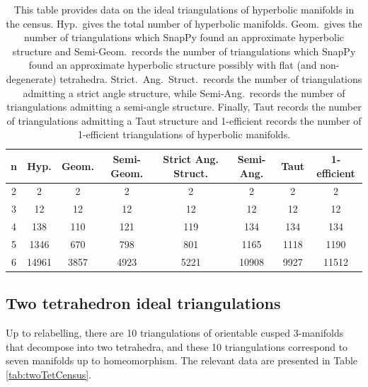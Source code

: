 \documentclass[12pt,reqno]{amsart}  %
\theoremstyle{definition}
\theoremstyle{remark}
\begin{document}
\begin{table}[h]
\begin{tabular}{|c|c|c|c|c|c|c|c|}
\hline
n & Hyp. &Geom. &Semi-Geom. & Strict Ang. Struct. & Semi-Ang.&  Taut & 1-efficient\\
\hline
2&	2&	  2&	    2&	  2 &2 &2 &2\\
\hline
3&	12& 12 & 12 & 12& 12& 12&12\\
\hline
4&	138& 110& 121 & 119 & 134 & 134 & 134\\
\hline
5&	1346&670&798&801&1165 & 1118&1190\\
\hline
6&	14961&3857&4923&5221&10908&9927&11512\\
\hline
\end{tabular}

\caption{\label{hypCensus} This table provides data on the ideal 
triangulations of hyperbolic manifolds in the census. Hyp.~gives the 
total number of hyperbolic manifolds. Geom.~gives the number of 
triangulations which SnapPy found an approximate hyperbolic structure 
and Semi-Geom.~records the number of triangulations which SnapPy found 
an approximate hyperbolic structure possibly with flat (and non-degenerate) 
tetrahedra. Strict.~Ang.~Struct.~records the number of triangulations 
admitting a strict angle structure, while Semi-Ang.~records the number of 
triangulations admitting a semi-angle structure. Finally, Taut records the 
number of triangulations admitting a Taut structure and 1-efficient records 
the number of 1-efficient triangulations of hyperbolic manifolds.}
\end{table}

\subsection{Two tetrahedron ideal triangulations} 

Up to relabelling, there are 10 triangulations of orientable cusped 
3-manifolds that decompose into two tetrahedra, and these 10 triangulations 
correspond to seven manifolds up to homeomorphism. The relevant data are 
presented in Table \ref{tab:twoTetCensus}.
\end{document}
